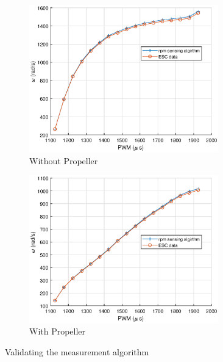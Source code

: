 \begin{figure}[H]
    \begin{minipage}{0.49\textwidth}
        \begin{figure}[H]
            \centering
            \includegraphics[width = 0.9\textwidth]{./figs/rpm_feedback/rpm_meas_noprop.eps}
            \caption*{Without Propeller}
        \end{figure}
    \end{minipage}
    \begin{minipage}{0.49\textwidth}
        \begin{figure}[H]
            \centering
            \includegraphics[width = 0.9\textwidth]{./figs/rpm_feedback/rpm_meas_prop.eps}
            \caption*{With Propeller}
        \end{figure}
    \end{minipage}
    \caption{Validating the measurement algorithm}
\end{figure}
